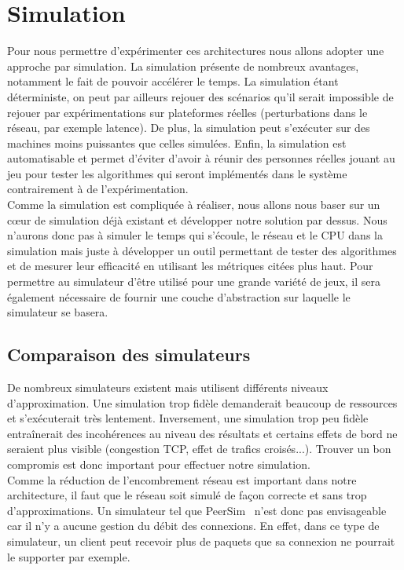 \section{Simulation}
Pour nous permettre d'expérimenter ces architectures nous allons adopter une approche par simulation. La simulation présente de nombreux avantages, notamment le fait de pouvoir accélérer le temps. La simulation étant déterministe, on peut par ailleurs rejouer des scénarios qu'il serait impossible de rejouer par expérimentations sur plateformes réelles (perturbations dans le réseau, par exemple latence). De plus, la simulation peut s'exécuter sur des machines moins puissantes que celles simulées. Enfin, la simulation est automatisable et permet d'éviter d'avoir à réunir des personnes réelles jouant au jeu pour tester les algorithmes qui seront implémentés dans le système contrairement à de l'expérimentation.\\

Comme la simulation est compliquée à réaliser, nous allons nous baser sur un c\oe{}ur de simulation déjà existant et développer notre solution par dessus. Nous n'aurons donc pas à simuler le temps qui s'écoule, le réseau et le CPU dans la simulation mais juste à développer un outil permettant de tester des algorithmes et de mesurer leur efficacité en utilisant les métriques citées plus haut. Pour permettre au simulateur d'être utilisé pour une grande variété de jeux, il sera également nécessaire de fournir une couche d'abstraction sur laquelle le simulateur se basera.

\subsection{Comparaison des simulateurs}
De nombreux simulateurs existent mais utilisent différents niveaux d'approximation. Une simulation trop fidèle demanderait beaucoup de ressources et s'exécuterait très lentement. Inversement, une simulation trop peu fidèle entraînerait des incohérences au niveau des résultats et certains effets de bord ne seraient plus visible (congestion TCP, effet de trafics croisés...). Trouver un bon compromis est donc important pour effectuer notre simulation.\\

Comme la réduction de l'encombrement réseau est important dans notre architecture, il faut que le réseau soit simulé de façon correcte et sans trop d'approximations. Un simulateur tel que PeerSim~\cite{peersim} n'est donc pas envisageable car il n'y a aucune gestion du débit des connexions. En effet, dans ce type de simulateur, un client peut recevoir plus de paquets que sa connexion ne pourrait le supporter par exemple.\\

